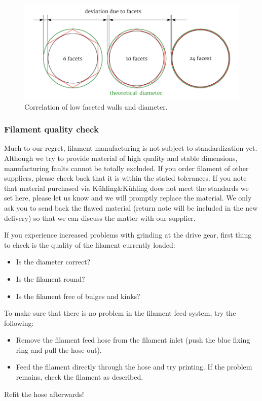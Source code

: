 \begin{figure}[H]
  \centering
  \includegraphics[width=.7\linewidth]{./img/diameterdeviationextrusion2.png}
  \caption{Correlation of low faceted walls and diameter.}
\end{figure}


\subsubsection{Filament quality check}

Much to our regret, filament manufacturing is not subject to standardization yet. Although we try to provide material of high quality and stable dimensions, manufacturing faults cannot be totally excluded.
If you order filament of other suppliers, please check back that it is within the stated tolerances.
If you note that material purchased via Kühling\&Kühling does not meet the standards we set here, please let us know and we will promptly replace the material. We only ask you to send back the flawed material (return note will be included in the new delivery) so that we can discuss the matter with our supplier. 

If you experience increased problems with grinding at the drive gear, first thing to check is the quality of the filament currently loaded:

\begin{itemize}
  \item Is the diameter correct? 
  \item Is the filament round? 
  \item Is the filament free of bulges and kinks? 
\end{itemize}

\begin{info}
  To make sure that there is no problem in the filament feed system, try the following:
  \begin{itemize}
    \item Remove the filament feed hose from the filament inlet (push the blue fixing ring 
          and pull the hose out).
    \item Feed the filament directly through the hose and try printing.
          If the problem remains, check the filament as described.
  \end{itemize}

  Refit the hose afterwards!
\end{info}


